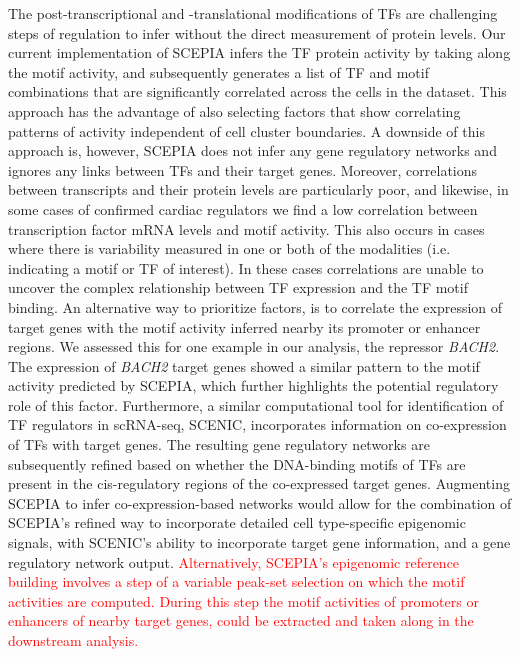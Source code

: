 The post-transcriptional and -translational modifications of TFs are challenging steps of regulation to infer without the direct measurement of protein levels. Our current implementation of SCEPIA infers the TF protein activity by taking along the motif activity, and subsequently generates a list of TF and motif combinations that are significantly correlated across the cells in the dataset. This approach has the advantage of also selecting factors that show correlating patterns of activity independent of cell cluster boundaries. A downside of this approach is, however, SCEPIA does not infer any gene regulatory networks and ignores any links between TFs and their target genes. Moreover, correlations between transcripts and their protein levels are particularly poor\cite{Fortelny2017,Franks2017}, and likewise, in some cases of confirmed cardiac regulators we find a low correlation between transcription factor mRNA levels and motif activity. This also occurs in cases where there is variability measured in one or both of the modalities (i.e. indicating a motif or TF of interest). In these cases correlations are unable to uncover the complex relationship between TF expression and the TF motif binding. An alternative way to prioritize factors, is to correlate the expression of target genes with the motif activity inferred nearby its promoter or enhancer regions. We assessed this for one example in our analysis, the repressor \textit{BACH2}. The expression of \textit{BACH2} target genes showed a similar pattern to the motif activity predicted by SCEPIA, which further highlights the potential regulatory role of this factor. Furthermore, a similar computational tool for identification of TF regulators in scRNA-seq, SCENIC\cite{Aibar_2017}, incorporates information on co-expression of TFs with target genes. The resulting gene regulatory networks are subsequently refined based on whether the DNA-binding motifs of TFs are present in the cis-regulatory regions of the co-expressed target genes. Augmenting SCEPIA to infer co-expression-based networks would allow for the combination of SCEPIA's refined way to incorporate detailed cell type-specific epigenomic signals, with SCENIC's ability to incorporate target gene information, and a gene regulatory network output. \textcolor{red}{Alternatively, SCEPIA's epigenomic reference building involves a step of a variable peak-set selection on which the motif activities are computed. During this step the motif activities of promoters or enhancers of nearby target genes, could be extracted and taken along in the downstream analysis.}

